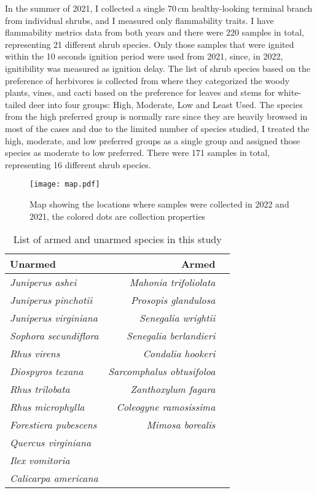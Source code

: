 \documentclass[12pt]{report}
\begin{document}
In the summer of 2021, I collected a single 70\,cm healthy-looking terminal branch from individual shrubs, and I measured only flammability traits.  I have flammability metrics data from both years and there were 220 samples in total, representing 21 different shrub species. Only those samples that were ignited within the 10 seconds ignition period were used from 2021, since, in 2022, ignitibility was measured as ignition delay. The list of shrub species based on the preference of herbivores is collected from \citep{wright2003white} where they categorized the woody plants, vines, and cacti based on the preference for leaves and stems for white-tailed deer into four groups: High, Moderate, Low and Least Used. The species from the high preferred group is normally rare since they are heavily browsed in most of the cases and due to the limited number of species studied, I treated the high, moderate, and low preferred groups as a single group and assigned those species as moderate to low preferred. There were 171 samples in total, representing 16 different shrub species.\\

\begin{figure}
    \centering
    \texttt{[image: map.pdf]}
    \caption{Map showing the locations where samples were collected in 2022 and 2021,
    the colored dots are collection properties}
\end{figure}

\begin{table}
    \centering
    \begin{tabular}{lrr}
          Unarmed &  Armed \\
          \hline
          \emph{Juniperus ashei} & \emph{Mahonia trifoliolata}\\
          \emph{Juniperus pinchotii} & \emph{Prosopis glandulosa}\\
          \emph{Juniperus virginiana} & \emph{Senegalia wrightii}\\
          \emph{Sophora secundiflora} & \emph{Senegalia berlandieri}\\
          \emph{Rhus virens} & \emph{Condalia hookeri}\\
          \emph{Diospyros texana} & \emph{Sarcomphalus obtusifoloa}\\
          \emph{Rhus trilobata} & \emph{Zanthoxylum fagara}\\
          \emph{Rhus microphylla} & \emph{Coleogyne ramosissima}\\
          \emph{Forestiera pubescens} & \emph{Mimosa borealis}\\
          \emph{Quercus virginiana} &   \\
          \emph{Ilex vomitoria} &    \\
          \emph{Calicarpa americana} & \\
    \end{tabular}
    \caption{List of armed and unarmed species in this study}
\end{table} 
\end{document}
